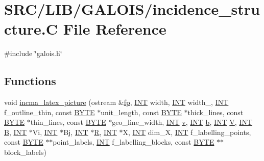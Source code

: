 \hypertarget{_g_a_l_o_i_s_2incidence__structure_8_c}{}\section{S\+R\+C/\+L\+I\+B/\+G\+A\+L\+O\+I\+S/incidence\+\_\+structure.C File Reference}
\label{_g_a_l_o_i_s_2incidence__structure_8_c}
{\ttfamily \#include \char`\"{}galois.\+h\char`\"{}}\newline
\subsection*{Functions}
\begin{DoxyCompactItemize}
\item 
void \mbox{\hyperlink{_g_a_l_o_i_s_2incidence__structure_8_c_ab3a9defe05b87227376bdd1e1756670f}{incma\+\_\+latex\+\_\+picture}} (ostream \&\mbox{\hyperlink{k__arc__lifting_8_c_a67cc9fbd0817c2d140368e5ed1f2a44d}{fp}}, \mbox{\hyperlink{galois_8h_a09fddde158a3a20bd2dcadb609de11dc}{I\+NT}} width, \mbox{\hyperlink{galois_8h_a09fddde158a3a20bd2dcadb609de11dc}{I\+NT}} width\+\_, \mbox{\hyperlink{galois_8h_a09fddde158a3a20bd2dcadb609de11dc}{I\+NT}} f\+\_\+outline\+\_\+thin, const \mbox{\hyperlink{galois_8h_ab6cc7b4aeb6ea31aba2b3fbfc83ff5e6}{B\+Y\+TE}} $\ast$unit\+\_\+length, const \mbox{\hyperlink{galois_8h_ab6cc7b4aeb6ea31aba2b3fbfc83ff5e6}{B\+Y\+TE}} $\ast$thick\+\_\+lines, const \mbox{\hyperlink{galois_8h_ab6cc7b4aeb6ea31aba2b3fbfc83ff5e6}{B\+Y\+TE}} $\ast$thin\+\_\+lines, const \mbox{\hyperlink{galois_8h_ab6cc7b4aeb6ea31aba2b3fbfc83ff5e6}{B\+Y\+TE}} $\ast$geo\+\_\+line\+\_\+width, \mbox{\hyperlink{galois_8h_a09fddde158a3a20bd2dcadb609de11dc}{I\+NT}} \mbox{\hyperlink{simeon_8_c_aeb3f3030944801b163bc3b829a7f6710}{v}}, \mbox{\hyperlink{galois_8h_a09fddde158a3a20bd2dcadb609de11dc}{I\+NT}} \mbox{\hyperlink{alphabet2_8_c_a148e3876077787926724625411d6e7a9}{b}}, \mbox{\hyperlink{galois_8h_a09fddde158a3a20bd2dcadb609de11dc}{I\+NT}} \mbox{\hyperlink{srg_8_c_af40a326b23c68a27cebe60f16634a2cb}{V}}, \mbox{\hyperlink{galois_8h_a09fddde158a3a20bd2dcadb609de11dc}{I\+NT}} \mbox{\hyperlink{costas_8_c_ad1f767566c3189fb90e9cffcc5dd4680}{B}}, \mbox{\hyperlink{galois_8h_a09fddde158a3a20bd2dcadb609de11dc}{I\+NT}} $\ast$Vi, \mbox{\hyperlink{galois_8h_a09fddde158a3a20bd2dcadb609de11dc}{I\+NT}} $\ast$Bj, \mbox{\hyperlink{galois_8h_a09fddde158a3a20bd2dcadb609de11dc}{I\+NT}} $\ast$\mbox{\hyperlink{pentomino__5x5_8_c_a9e6c5a8291295bd0292db81cc90cb2cf}{R}}, \mbox{\hyperlink{galois_8h_a09fddde158a3a20bd2dcadb609de11dc}{I\+NT}} $\ast$X, \mbox{\hyperlink{galois_8h_a09fddde158a3a20bd2dcadb609de11dc}{I\+NT}} dim\+\_\+X, \mbox{\hyperlink{galois_8h_a09fddde158a3a20bd2dcadb609de11dc}{I\+NT}} f\+\_\+labelling\+\_\+points, const \mbox{\hyperlink{galois_8h_ab6cc7b4aeb6ea31aba2b3fbfc83ff5e6}{B\+Y\+TE}} $\ast$$\ast$point\+\_\+labels, \mbox{\hyperlink{galois_8h_a09fddde158a3a20bd2dcadb609de11dc}{I\+NT}} f\+\_\+labelling\+\_\+blocks, const \mbox{\hyperlink{galois_8h_ab6cc7b4aeb6ea31aba2b3fbfc83ff5e6}{B\+Y\+TE}} $\ast$$\ast$block\+\_\+labels)

\end{DoxyCompactItemize}
